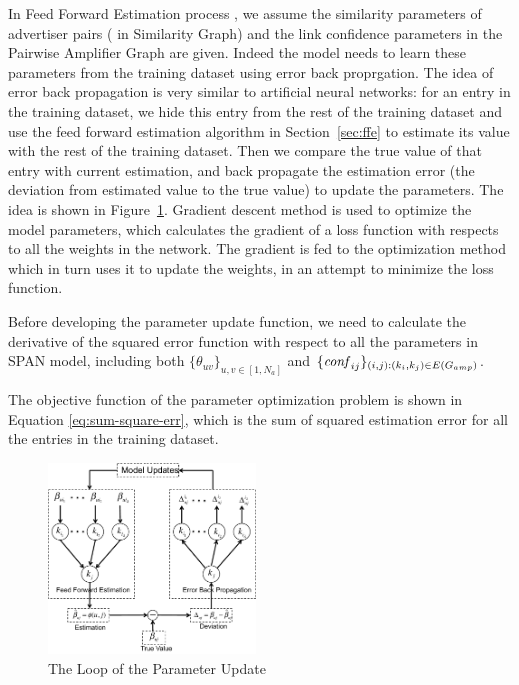 In Feed Forward Estimation process , we assume the similarity
parameters of advertiser pairs ( in Similarity Graph) and the link
confidence parameters in the Pairwise Amplifier Graph are
given. Indeed the model needs to learn these parameters from the
training dataset using error back proprgation.  The idea of error back
propagation is very similar to artificial neural networks: for an
entry in the training dataset, we hide this entry from the rest of the
training dataset and use the feed forward estimation algorithm in
Section~\ref{sec:ffe} to estimate its value with the rest of the
training dataset. Then we compare the true value of that entry with
current estimation, and back propagate the estimation error (the
deviation from estimated value to the true value) to update the
parameters.  The idea is shown in
Figure~\ref{fig:trainer-train-entry}.  Gradient descent method
\cite{?} is used to optimize the model parameters, which calculates
the gradient of a loss function with respects to all the weights in
the network. The gradient is fed to the optimization method which in
turn uses it to update the weights, in an attempt to minimize the loss
function.

Before developing the parameter update function, we need to calculate
the derivative of the squared error function with respect to all the
parameters in SPAN model, including both
$\{\theta_{uv}\}_{u,v\in[1,N_a]}$ and
$\{\mathit{conf}_{ij}\}_{(i,j):(k_i,k_j)\in E(G_{amp})}$.

The objective function of the parameter optimization problem is shown
in Equation \ref{eq:sum-square-err}, which is the sum of squared
estimation error for all the entries in the training dataset.

\begin{figure}[!ht]
  \centering
  \includegraphics[width=0.49\textwidth]{figures/trainer_train_entry.pdf}
  \caption{The Loop of the Parameter Update}
  \label{fig:trainer-train-entry}
\end{figure}


